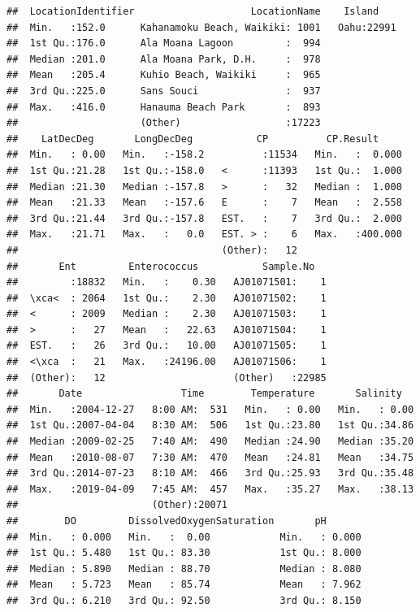 \documentclass[12pt,]{article}
\begin{document}
\begin{verbatim}
##  LocationIdentifier                    LocationName    Island     
##  Min.   :152.0      Kahanamoku Beach, Waikiki: 1001   Oahu:22991  
##  1st Qu.:176.0      Ala Moana Lagoon         :  994               
##  Median :201.0      Ala Moana Park, D.H.     :  978               
##  Mean   :205.4      Kuhio Beach, Waikiki     :  965               
##  3rd Qu.:225.0      Sans Souci               :  937               
##  Max.   :416.0      Hanauma Beach Park       :  893               
##                     (Other)                  :17223               
##    LatDecDeg       LongDecDeg           CP          CP.Result      
##  Min.   : 0.00   Min.   :-158.2          :11534   Min.   :  0.000  
##  1st Qu.:21.28   1st Qu.:-158.0   <      :11393   1st Qu.:  1.000  
##  Median :21.30   Median :-157.8   >      :   32   Median :  1.000  
##  Mean   :21.33   Mean   :-157.6   E      :    7   Mean   :  2.558  
##  3rd Qu.:21.44   3rd Qu.:-157.8   EST.   :    7   3rd Qu.:  2.000  
##  Max.   :21.71   Max.   :   0.0   EST. > :    6   Max.   :400.000  
##                                   (Other):   12                    
##       Ent         Enterococcus           Sample.No    
##         :18832   Min.   :    0.30   AJ01071501:    1  
##  \xca<  : 2064   1st Qu.:    2.30   AJ01071502:    1  
##  <      : 2009   Median :    2.30   AJ01071503:    1  
##  >      :   27   Mean   :   22.63   AJ01071504:    1  
##  EST.   :   26   3rd Qu.:   10.00   AJ01071505:    1  
##  <\xca  :   21   Max.   :24196.00   AJ01071506:    1  
##  (Other):   12                      (Other)   :22985  
##       Date                 Time        Temperature       Salinity    
##  Min.   :2004-12-27   8:00 AM:  531   Min.   : 0.00   Min.   : 0.00  
##  1st Qu.:2007-04-04   8:30 AM:  506   1st Qu.:23.80   1st Qu.:34.86  
##  Median :2009-02-25   7:40 AM:  490   Median :24.90   Median :35.20  
##  Mean   :2010-08-07   7:30 AM:  470   Mean   :24.81   Mean   :34.75  
##  3rd Qu.:2014-07-23   8:10 AM:  466   3rd Qu.:25.93   3rd Qu.:35.48  
##  Max.   :2019-04-09   7:45 AM:  457   Max.   :35.27   Max.   :38.13  
##                       (Other):20071                                  
##        DO         DissolvedOxygenSaturation       pH        
##  Min.   : 0.000   Min.   :  0.00            Min.   : 0.000  
##  1st Qu.: 5.480   1st Qu.: 83.30            1st Qu.: 8.000  
##  Median : 5.890   Median : 88.70            Median : 8.080  
##  Mean   : 5.723   Mean   : 85.74            Mean   : 7.962  
##  3rd Qu.: 6.210   3rd Qu.: 92.50            3rd Qu.: 8.150  

\end{verbatim}
\end{document}
